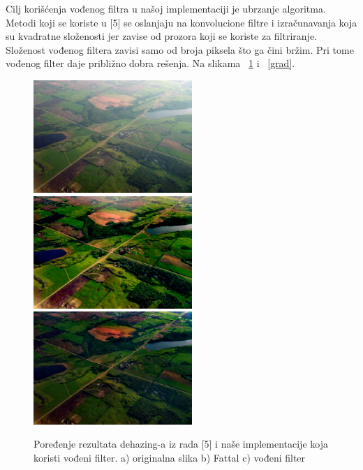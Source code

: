 \documentclass[a4paper,12pt,titlepage]{article}
\begin{document}
Cilj korišćenja vođenog filtra u našoj implementaciji je ubrzanje algoritma. Metodi koji se koriste u [5] se oslanjaju na konvolucione filtre i izračunavanja koja su kvadratne složenosti jer zavise od prozora koji se koriste za filtriranje. Složenost vođenog filtera zavisi samo od broja piksela što ga čini bržim. Pri tome vođenog filter daje približno dobra rešenja. Na slikama ~\ref{aerial} i ~\ref{grad}. 

\begin{figure}[ht!]
\centering
\includegraphics[width=60mm]{img/aerial.png}
\includegraphics[width=60mm]{img/aerialFattal.png}
\includegraphics[width=60mm]{img/aerialDe.png}
\caption{Poređenje rezultata dehazing-a iz rada [5] i naše implementacije koja koristi vođeni filter. a) originalna slika b) Fattal c) vođeni filter}
\label{aerial}
\end{figure} 
\end{document}
